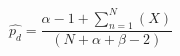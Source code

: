 \documentclass{article}
\begin{document}
$$\hat{p_d} =  \frac{\alpha - 1 +\sum_{n=1}^{N} (X)}{(N+\alpha+\beta-2)}$$


\end{document}
